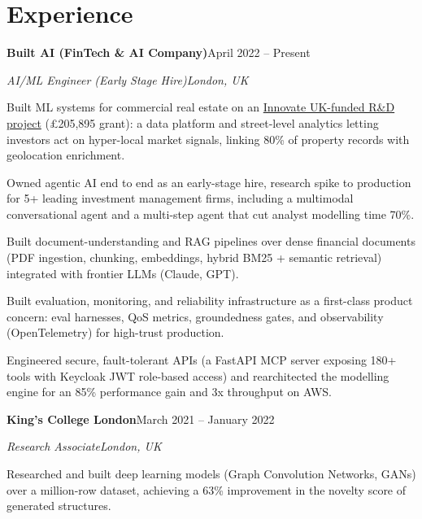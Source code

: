 \documentclass[10pt,a4paper]{article}
\newcommand{\entry}[4]{%
  {\color{company}\bfseries #1}\hfill {\color{muted}#2}\par
  \vspace{1pt}
  {\itshape #3}\hfill {\color{muted}\itshape #4}\par
  \vspace{3pt}%
}
\begin{document}
\section{Experience}
\entry{Built AI (FinTech \& AI Company)}{April 2022 -- Present}{AI/ML Engineer (Early Stage Hire)}{London, UK}
\begin{tight}
  \item Built ML systems for commercial real estate on an \href{https://gtr.ukri.org/projects?ref=10022996}{Innovate UK-funded R\&D project} (\pounds205,895 grant): a data platform and street-level analytics letting investors act on hyper-local market signals, linking 80\% of property records with geolocation enrichment.
  \item Owned agentic AI end to end as an early-stage hire, research spike to production for 5+ leading investment management firms, including a multimodal conversational agent and a multi-step agent that cut analyst modelling time 70\%.
  \item Built document-understanding and RAG pipelines over dense financial documents (PDF ingestion, chunking, embeddings, hybrid BM25 + semantic retrieval) integrated with frontier LLMs (Claude, GPT).
  \item Built evaluation, monitoring, and reliability infrastructure as a first-class product concern: eval harnesses, QoS metrics, groundedness gates, and observability (OpenTelemetry) for high-trust production.
  \item Engineered secure, fault-tolerant APIs (a FastAPI MCP server exposing 180+ tools with Keycloak JWT role-based access) and rearchitected the modelling engine for an 85\% performance gain and 3x throughput on AWS.
\end{tight}

\entry{King's College London}{March 2021 -- January 2022}{Research Associate}{London, UK}
\begin{tight}
  \item Researched and built deep learning models (Graph Convolution Networks, GANs) over a million-row dataset, achieving a 63\% improvement in the novelty score of generated structures.
\end{tight}

\end{document}
